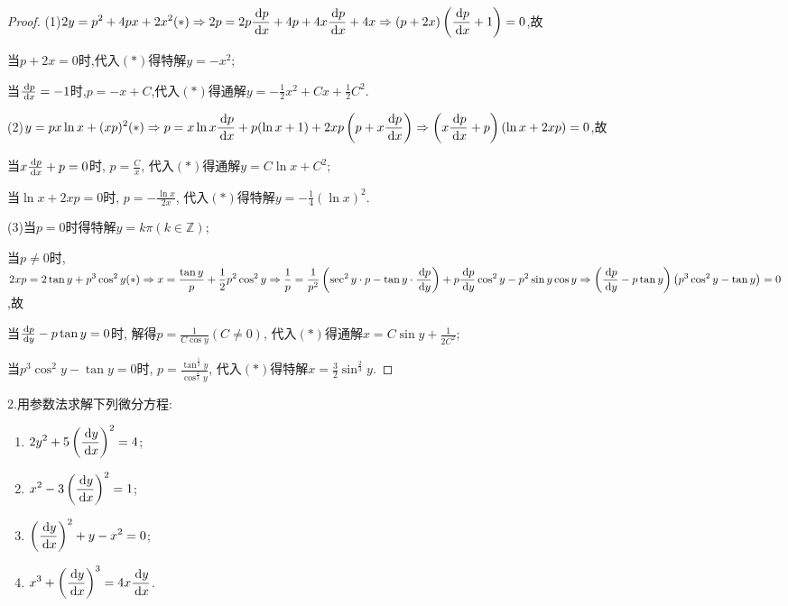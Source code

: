 \begin{proof}
(1)$\displaystyle 2y=p^2+4px+2x^2(*)
\Rightarrow2p=2p\frac{\,\mathrm{d} p}{\,\mathrm{d} x}+4p+4x\frac{\,\mathrm{d} p}{\,\mathrm{d} x}+4x\Rightarrow(p+2x)\left(\frac{\,\mathrm{d} p}{\,\mathrm{d} x}+1\right)=0$,故

当$p+2x=0$时,代入$(*)$得特解$y=-x^2$;

当$\frac{\,\mathrm{d} p}{\,\mathrm{d} x}=-1$时,$p=-x+C$,代入$(*)$得通解$y=-\frac{1}{2}x^2+Cx+\frac{1}{2}C^2$.

(2)$\displaystyle y=px\ln x+(xp)^2(*)\Rightarrow p=x\ln x\frac{\,\mathrm{d} p}{\,\mathrm{d} x}+p(\ln x+1)+2xp\left(p+x\frac{\,\mathrm{d} p}{\,\mathrm{d} x}\right)\Rightarrow\left(x\frac{\,\mathrm{d} p}{\,\mathrm{d} x}+p\right)(\ln x+2xp)=0$,故

当$x\frac{\,\mathrm{d} p}{\,\mathrm{d} x}+p=0$时, $p=\frac{C}{x}$, 代入$(*)$得通解$y=C\ln x+C^2$;

当$\ln x+2xp=0$时, $p=-\frac{\ln x}{2x}$, 代入$(*)$得特解$y=-\frac{1}{4}(\ln x)^2$.

(3)当$p=0$时得特解$y=k\pi(k\in\mathbb{Z})$;

当$p\neq0$时,$\displaystyle2xp=2\tan y+p^3\cos^2y(*)\Rightarrow x=\frac{\tan y}{p}+\frac{1}{2}p^2\cos^2y\Rightarrow\frac{1}{p}=\frac{1}{p^2}\left(\sec^2y\cdot p-\tan y\cdot\frac{\,\mathrm{d} p}{\,\mathrm{d} y}\right)+p\frac{\,\mathrm{d} p}{\,\mathrm{d} y}\cos^2y-p^2\sin y\cos y\Rightarrow\left(\frac{\,\mathrm{d} p}{\,\mathrm{d} y}-p\tan y\right)\left(p^3\cos^2y-\tan y\right)=0$,故

当$\frac{\,\mathrm{d} p}{\,\mathrm{d} y}-p\tan y=0$时, 解得$p=\frac{1}{C\cos y}(C\neq0)$, 代入$(*)$得通解$x=C\sin y+\frac{1}{2C^2}$;

当$p^3\cos^2y-\tan y=0$时, $p=\frac{\tan^{\frac{1}{3}}y}{\cos^{\frac{2}{3}}y}$, 代入$(*)$得特解$x=\frac{3}{2}\sin^{\frac{2}{3}}y$.
\end{proof}


2.用参数法求解下列微分方程:
\begin{enumerate}[(1)]
\item $\displaystyle 2y^2+5\left(\frac{\,\mathrm{d} y}{\,\mathrm{d} x}\right)^2=4$;
\item $\displaystyle x^2-3\left(\frac{\,\mathrm{d} y}{\,\mathrm{d} x}\right)^2=1$;
\item $\displaystyle\left(\frac{\,\mathrm{d} y}{\,\mathrm{d} x}\right)^2+y-x^2=0$;
\item $\displaystyle x^3+\left(\frac{\,\mathrm{d} y}{\,\mathrm{d} x}\right)^3=4x\frac{\,\mathrm{d} y}{\,\mathrm{d} x}$.
\end{enumerate}

